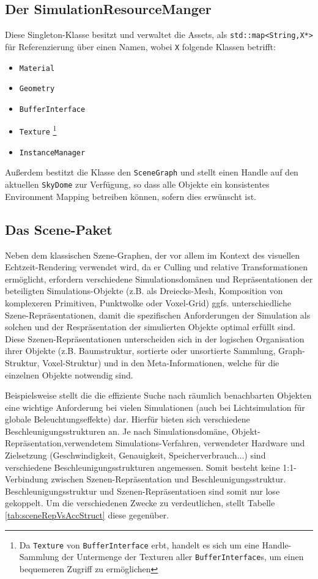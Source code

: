 \subsection{Der SimulationResourceManger}
	Diese Singleton-Klasse besitzt und verwaltet die Assets,\linebreak 
	als \lstinline|std::map<String,X*>| für Referenzierung über einen Namen, 
	wobei \lstinline|X| folgende Klassen betrifft: 
	\begin{itemize}
		\item \lstinline|Material|
		\item \lstinline|Geometry|
		\item \lstinline|BufferInterface|
		\item \lstinline|Texture| \footnote{Da \lstinline|Texture| von \lstinline|BufferInterface| erbt, 
		handelt es sich um eine Handle-Sammlung der Untermenge der Texturen aller \lstinline|BufferInterface|s,
		um einen bequemeren Zugriff zu ermöglichen}
		\item \lstinline|InstanceManager|
	\end{itemize}
	Außerdem bestitzt die Klasse den \lstinline|SceneGraph| und stellt einen Handle auf den aktuellen 
	\lstinline|SkyDome| zur Verfügung, so dass alle Objekte ein konsistentes Environment Mapping 
	betreiben können, sofern dies erwünscht ist.

		
\subsection{Das Scene-Paket}		
	Neben dem klassischen Szene-Graphen, der vor allem im Kontext des visuellen Echtzeit-Rendering verwendet wird,
	da er Culling und relative Transformationen ermöglicht, 
	erfordern verschiedene Simulationsdomänen und Repräsentationen der beteiligten Simulations-Objekte
	(z.B. als Dreiecks-Mesh, Komposition von komplexeren Primitiven, Punktwolke oder Voxel-Grid)  ggfs. 
	unterschiedliche Szene-Repräsentationen, damit die spezifischen Anforderungen der Simulation als solchen und der
	Respräsentation der simulierten Objekte optimal erfüllt sind.\\
	Diese Szenen-Repräsentationen unterscheiden sich in der logischen Organisation ihrer Objekte 
	(z.B. Baumstruktur, sortierte oder unsortierte Sammlung, Graph-Struktur, Voxel-Struktur) 
	und in den Meta-Informationen, welche für die einzelnen	Objekte notwendig sind.
	
	Beispielsweise stellt die die effiziente Suche nach räumlich benachbarten Objekten eine wichtige Anforderung
	bei vielen Simulationen (auch bei Lichtsimulation für globale Beleuchtungseffekte) dar.
	Hierfür bieten sich verschiedene Beschleunigungsstrukturen an. Je nach Simulationsdomäne, 
	Objekt-Repräsentation,verwendetem Simulations-Verfahren, verwendeter Hardware und Zielsetzung 
	(Geschwindigkeit, Genauigkeit, Speicherverbrauch...) sind verschiedene Beschleunigungsstrukturen angemessen.
	Somit besteht keine 1:1-Verbindung zwischen Szenen-Repräsentation und Beschleunigungsstruktur.\\
	Beschleunigungsstruktur und Szenen-Repräsentatioen sind somit nur lose gekoppelt.
	Um die verschiedenen Zwecke zu verdeutlichen, stellt Tabelle \ref{tab:sceneRepVsAccStruct} diese gegenüber.


